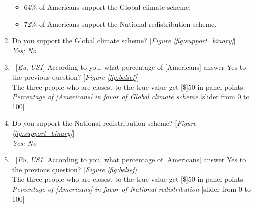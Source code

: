 \begin{enumerate}[resume]
\begin{itemize} 
    \item 64\% of Americans support the Global climate scheme. 	
    \item 72\% of Americans support the National redistribution scheme. 
\end{itemize}
\item \label{q:gcs_support} Do you support the Global climate scheme? [\textit{Figure \ref{fig:support_binary}}]
\\ \textit{Yes; No}
\item ~[\textit{Eu}, \textit{US1}] \label{q:gcs_belief} According to you, what percentage of [Americans] answer Yes to the previous question? [\textit{Figure \ref{fig:belief}}]\\
The three people who are closest to the true value get [\$]50 in panel points.
\\ \textit{Percentage of [Americans] in favor of Global climate scheme} [slider from 0 to 100]
\item \label{q:nr_support} Do you support the National redistribution scheme? [\textit{Figure \ref{fig:support_binary}}]
\\ \textit{Yes; No}
\item ~[\textit{Eu}, \textit{US1}] \label{q:nr_belief} According to you, what percentage of [Americans] answer Yes to the previous question? [\textit{Figure \ref{fig:belief}}]\\
The three people who are closest to the true value get [\$]50 in panel points.
\\ \textit{Percentage of [Americans] in favor of National redistribution } [slider from 0 to 100]

\end{enumerate}

